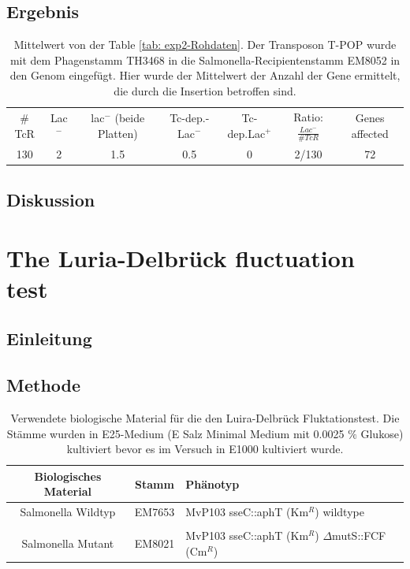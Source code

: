\documentclass[oneside,10pt,a4paper]{report}
\begin{document}
		\section{Ergebnis}
			\begin{table}[H]
			\centering
			\caption{Mittelwert von der Table \ref{tab: exp2-Rohdaten}. Der Transposon T-POP wurde mit dem Phagenstamm TH3468 in die Salmonella-Recipientenstamm EM8052 in den Genom eingefügt. Hier wurde der Mittelwert der Anzahl der Gene ermittelt, die durch die Insertion betroffen sind.}
			\label{tab: exp2-ergebnis}
			\begin{tabular}{ccccccc}
				\toprule
			\multirow{2}{*}{$\#$TcR} & \multirow{2}{*}{Lac$^-$}&\multirow{2}{*}{lac$^-$ (beide Platten)} & \multirow{2}{*}{Tc-dep.-Lac$^-$}& \multirow{2}{*}{Tc-dep.Lac$^+$}& \multirow{2}{*}{Ratio: $\frac{Lac^-}{\#TcR}$}&\multirow{2}{*}{\parbox[*]{1.2cm}{Genes affected}}\\
				&&&&&&\\
				\midrule
				130 & 2 & 1.5 & 0.5 & 0 & 2/130 & 72\\
				\bottomrule			
			\end{tabular}
		\end{table}
		\section{Diskussion}

	
	\chapter{The Luria-Delbrück fluctuation test}	
		\section{Einleitung}
		\section{Methode}
			\begin{table}[H]
			\centering
			\caption{Verwendete biologische Material für die den Luira-Delbrück Fluktationstest. Die Stämme wurden in E25-Medium (E Salz Minimal Medium mit 0.0025 $\%$ Glukose) kultiviert bevor es im Versuch in E1000 kultiviert wurde.}
			\label{tab: exp4-biologisches Material}
			\begin{tabular}{ccp{7.5cm}}
				\toprule
				Biologisches Material& Stamm & Phänotyp\\
				\midrule
				\multirow{2}{*}{\parbox[t]{2cm}{Salmonella Wildtyp}}  & \multirow{2}{*}{EM7653} & \multirow{2}{*}{MvP103 sseC::aphT (Km$^R$) wildtype}\\
				&&\\
				&&\\
				\multirow{3}{*}{\parbox[t]{2cm}{Salmonella Mutant}} & \multirow{3}{*}{EM8021} &\multirow{3}{*}{MvP103 sseC::aphT (Km$^R$) $\Delta$mutS::FCF (Cm$^R$)} \\
				&&\\
				&&\\
				
				\bottomrule			
			\end{tabular}
		\end{table}
		
\end{document}
